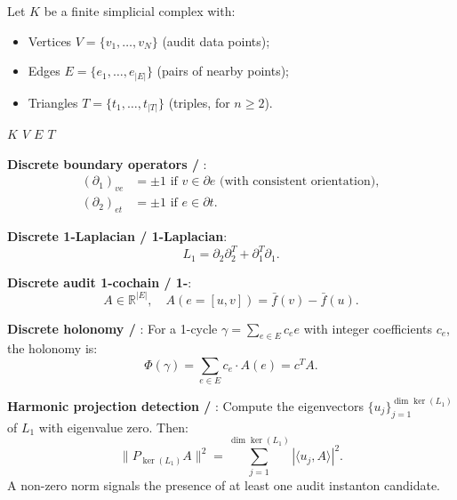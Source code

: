 \documentclass[11pt,a4paper]{article}
\theoremstyle{plain}
\theoremstyle{definition}
\newcommand{\R}{\mathbb{R}}
\begin{document}

Let $K$ be a finite simplicial complex with:
\begin{itemize}
  \item Vertices $V = \{v_1, \ldots, v_N\}$ (audit data points);
  \item Edges $E = \{e_1, \ldots, e_{|E|}\}$ (pairs of nearby points);
  \item Triangles $T = \{t_1, \ldots, t_{|T|}\}$ (triples, for $n \geq 2$).
\end{itemize}

\bigskip
\noindent
\textit{ $K$  $V$ $E$  $T$}

\medskip
\noindent
\textbf{Discrete boundary operators / }:
\begin{align}
  (\partial_1)_{ve} &= \pm 1 \text{ if } v \in \partial e \text{ (with consistent orientation)}, \\
  (\partial_2)_{et} &= \pm 1 \text{ if } e \in \partial t.
\end{align}

\noindent
\textbf{Discrete 1-Laplacian / 1-Laplacian}:
\begin{equation}
  L_1 = \partial_2 \partial_2^T + \partial_1^T \partial_1.
  \label{eq:disc_laplacian}
\end{equation}

\noindent
\textbf{Discrete audit 1-cochain / 1-}:
\begin{equation}
  A \in \R^{|E|}, \quad A(e = [u, v]) = \bar{f}(v) - \bar{f}(u).
  \label{eq:disc_A}
\end{equation}

\noindent
\textbf{Discrete holonomy / }:
For a 1-cycle $\gamma = \sum_{e \in E} c_e e$ with integer coefficients 
$c_e$, the holonomy is:
\begin{equation}
  \Phi(\gamma) = \sum_{e \in E} c_e \cdot A(e) = c^T A.
  \label{eq:disc_hol}
\end{equation}

\noindent
\textbf{Harmonic projection detection / }:
Compute the eigenvectors $\{u_j\}_{j=1}^{\dim \ker(L_1)}$ of $L_1$ with 
eigenvalue zero. Then:
\begin{equation}
  \|P_{\ker(L_1)} A\|^2 = \sum_{j=1}^{\dim \ker(L_1)} |\langle u_j, A \rangle|^2.
  \label{eq:disc_proj}
\end{equation}
A non-zero norm signals the presence of at least one audit instanton candidate.
\end{document}

